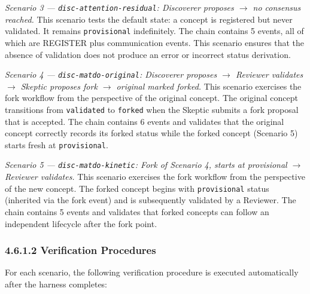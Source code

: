 \emph{Scenario 3 --- \texttt{disc-attention-residual}: Discoverer proposes \(\rightarrow\) no consensus reached.} This scenario tests the default state: a concept is registered but never validated. It remains \texttt{provisional} indefinitely. The chain contains 5 events, all of which are REGISTER plus communication events. This scenario ensures that the absence of validation does not produce an error or incorrect status derivation.

\emph{Scenario 4 --- \texttt{disc-matdo-original}: Discoverer proposes \(\rightarrow\) Reviewer validates \(\rightarrow\) Skeptic proposes fork \(\rightarrow\) original marked forked.} This scenario exercises the fork workflow from the perspective of the original concept. The original concept transitions from \texttt{validated} to \texttt{forked} when the Skeptic submits a fork proposal that is accepted. The chain contains 6 events and validates that the original concept correctly records its forked status while the forked concept (Scenario 5) starts fresh at \texttt{provisional}.

\emph{Scenario 5 --- \texttt{disc-matdo-kinetic}: Fork of Scenario 4, starts at provisional \(\rightarrow\) Reviewer validates.} This scenario exercises the fork workflow from the perspective of the new concept. The forked concept begins with \texttt{provisional} status (inherited via the fork event) and is subsequently validated by a Reviewer. The chain contains 5 events and validates that forked concepts can follow an independent lifecycle after the fork point.

\subsubsection{4.6.1.2 Verification Procedures}\label{verification-procedures}

For each scenario, the following verification procedure is executed automatically after the harness completes:

